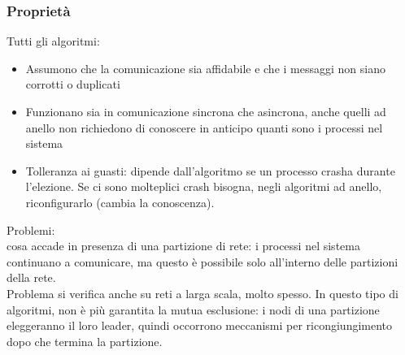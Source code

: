 \documentclass{article}
\begin{document}
\subsubsection{Proprietà}
Tutti gli algoritmi:
\begin{itemize}
\item Assumono che la comunicazione sia affidabile e che i messaggi non siano corrotti o duplicati
\item Funzionano sia in comunicazione sincrona che asincrona, anche quelli ad anello non richiedono di conoscere in anticipo quanti sono i processi nel sistema
\item Tolleranza ai guasti: dipende dall'algoritmo se un processo crasha durante l'elezione. Se ci sono molteplici crash bisogna, negli algoritmi ad anello, riconfigurarlo (cambia la conoscenza).
\end{itemize}
Problemi:\\ cosa accade in presenza di una partizione di rete: i processi nel sistema continuano a comunicare, ma questo è possibile solo all'interno delle partizioni della rete.\\ Problema si verifica anche su reti a larga scala, molto spesso. In questo tipo di algoritmi, non è più garantita la mutua esclusione: i nodi di una partizione eleggeranno il loro leader, quindi occorrono meccanismi per ricongiungimento dopo che termina la partizione.
\end{document}
